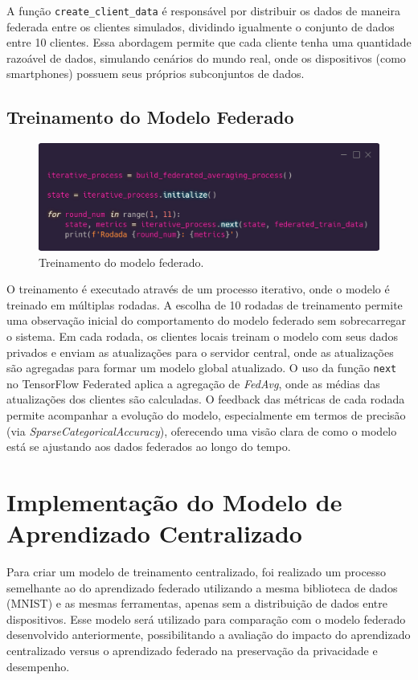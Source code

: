 A função \texttt{create\_client\_data} é responsável por distribuir os dados de maneira federada entre os clientes simulados, dividindo igualmente o conjunto de dados entre 10 clientes. Essa abordagem permite que cada cliente tenha uma quantidade razoável de dados, simulando cenários do mundo real, onde os dispositivos (como smartphones) possuem seus próprios subconjuntos de dados.

\subsection{Treinamento do Modelo Federado}

\begin{figure}[ht]
    \centering
    \includegraphics[scale=0.25]{figuras/modelTraining.eps}
    \caption{Treinamento do modelo federado.}
    \label{fig:modelTraining}
\end{figure}

O treinamento é executado através de um processo iterativo, onde o modelo é treinado em múltiplas rodadas. A escolha de 10 rodadas de treinamento permite uma observação inicial do comportamento do modelo federado sem sobrecarregar o sistema. Em cada rodada, os clientes locais treinam o modelo com seus dados privados e enviam as atualizações para o servidor central, onde as atualizações são agregadas para formar um modelo global atualizado. O uso da função \texttt{next} no TensorFlow Federated aplica a agregação de \textit{FedAvg}, onde as médias das atualizações dos clientes são calculadas. O feedback das métricas de cada rodada permite acompanhar a evolução do modelo, especialmente em termos de precisão (via \textit{SparseCategoricalAccuracy}), oferecendo uma visão clara de como o modelo está se ajustando aos dados federados ao longo do tempo.

\section{Implementação do Modelo de Aprendizado Centralizado}

Para criar um modelo de treinamento centralizado, foi realizado um processo semelhante ao do aprendizado federado utilizando a mesma biblioteca de dados (MNIST) e as mesmas ferramentas, apenas sem a distribuição de dados entre dispositivos. Esse modelo será utilizado para comparação com o modelo federado desenvolvido anteriormente, possibilitando a avaliação do impacto do aprendizado centralizado versus o aprendizado federado na preservação da privacidade e desempenho.

